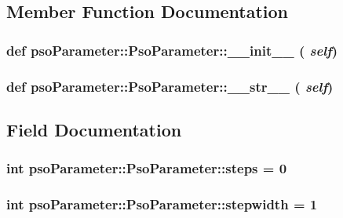 \subsection{Member Function Documentation}
\hypertarget{classpsoParameter_1_1PsoParameter_92fb4bd52063b526b0f8e590fc79446f}{
\subsubsection{\setlength{\rightskip}{0pt plus 5cm}def psoParameter::PsoParameter::\_\-\_\-init\_\-\_\- ( {\em self})}}
\label{classpsoParameter_1_1PsoParameter_92fb4bd52063b526b0f8e590fc79446f}


\hypertarget{classpsoParameter_1_1PsoParameter_49fdfaf70f45a0a55bdfecb622a41dd7}{
\subsubsection{\setlength{\rightskip}{0pt plus 5cm}def psoParameter::PsoParameter::\_\-\_\-str\_\-\_\- ( {\em self})}}
\label{classpsoParameter_1_1PsoParameter_49fdfaf70f45a0a55bdfecb622a41dd7}




\subsection{Field Documentation}
\hypertarget{classpsoParameter_1_1PsoParameter_1cf54a5e5ce2d1a6e3f2065ed99e47c4}{
\subsubsection{\setlength{\rightskip}{0pt plus 5cm}int {\bf psoParameter::PsoParameter::steps} = 0}}
\label{classpsoParameter_1_1PsoParameter_1cf54a5e5ce2d1a6e3f2065ed99e47c4}


\hypertarget{classpsoParameter_1_1PsoParameter_cdf8742e38848f67713f91fe8b8e165a}{
\subsubsection{\setlength{\rightskip}{0pt plus 5cm}int {\bf psoParameter::PsoParameter::stepwidth} = 1}}
\label{classpsoParameter_1_1PsoParameter_cdf8742e38848f67713f91fe8b8e165a}


